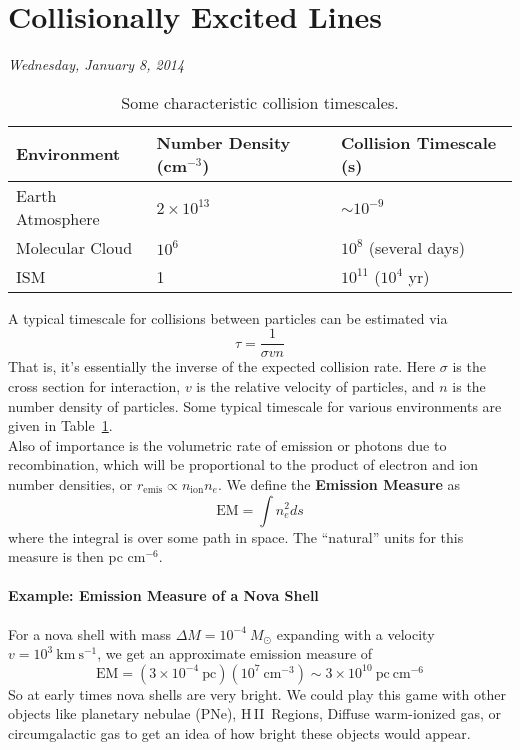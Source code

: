 \documentclass[10pt]{article}
\numberwithin{equation}{section}
\newcommand{\n}{\noindent}
\newcommand{\HII}{H\,II\ }
\begin{document}
\section{Collisionally Excited Lines} %
\label{sec:collisionally_excited_lines}
\n\textit{Wednesday, January 8, 2014}\\

\begin{table}
  \centering
  \begin{tabular}{l l l}
  Environment & Number Density (cm$^{-3}$) & Collision Timescale (s)\\
  \hline
  Earth Atmosphere & $2\times 10^{13}$ & $\sim 10^{-9}$\\
  Molecular Cloud & $10^6$ & $10^8$ (several days)\\
  ISM & 1 & $10^{11}$ ($10^4$ yr)
  \end{tabular}
  \caption{Some characteristic collision timescales.}
  \label{tab:2.1}
\end{table}
\n A typical timescale for collisions between particles can be estimated via
\begin{equation}
  \label{eq:coll:1} \tau = \frac{1}{\sigma v n}
\end{equation}
That is, it's essentially the inverse of the expected collision rate. Here
$\sigma$ is the cross section for interaction, $v$ is the relative velocity of
particles, and $n$ is the number density of particles. Some typical timescale
for various environments are given in Table~\ref{tab:2.1}.\\

\n Also of importance is the volumetric rate of emission or photons due to
recombination, which will be proportional to the product of electron and ion
number densities, or $r_{\mathrm{emis}}\propto n_{\mathrm{ion}}n_e$. We define
the \textbf{Emission Measure} as
\begin{equation}
  \label{eq:coll:2} \mathrm{EM} = \int n_e^2 ds
\end{equation}
where the integral is over some path in space. The ``natural'' units for this
measure is then pc cm$^{-6}$.
\paragraph{Example: Emission Measure of a Nova Shell} %
\label{par:example_emission_measure_of_a_nova_shell}
  For a nova shell with mass $\Delta M = 10^{-4}\ M_\odot$ expanding with a
  velocity $v=10^3\ \mathrm{km\ s^{-1}}$, we get an approximate emission
  measure of
  \begin{equation}
    \mathrm{EM} = (3\times 10^{-4}\ \mathrm{pc})(10^7\ \mathrm{cm^{-3}}) \sim
    3\times 10^{10}\ \mathrm{pc\ cm^{-6}}
  \end{equation}
  So at early times nova shells are very bright. We could play this game with
  other objects like planetary nebulae (PNe), \HII Regions, Diffuse warm-ionized
  gas, or circumgalactic gas to get an idea of how bright these objects would
  appear.
\end{document}
